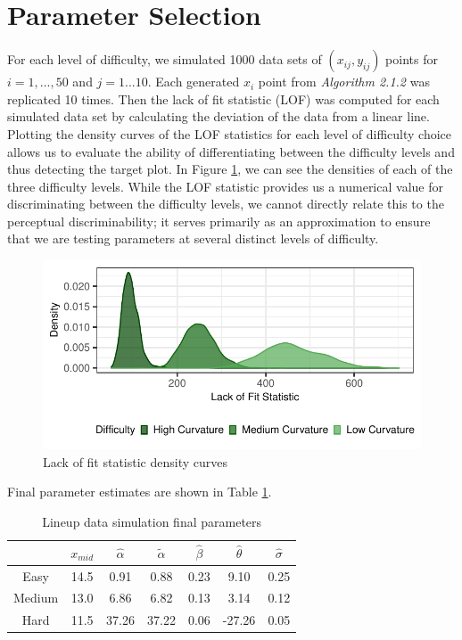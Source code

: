 \documentclass[print]{nuthesis}
\begin{document}
\hypertarget{parameter-selection}{%
\section{Parameter Selection}\label{parameter-selection}}

For each level of difficulty, we simulated 1000 data sets of \((x_{ij}, y_{ij})\) points for \(i = 1,...,50\) and \(j = 1...10\).
Each generated \(x_i\) point from \textit{Algorithm 2.1.2} was replicated 10 times. Then the lack of fit statistic (LOF) was computed for each simulated data set by calculating the deviation of the data from a linear line.
Plotting the density curves of the LOF statistics for each level of difficulty choice allows us to evaluate the ability of differentiating between the difficulty levels and thus detecting the target plot.
In Figure \ref{fig:lof-density-curves}, we can see the densities of each of the three difficulty levels.
While the LOF statistic provides us a numerical value for discriminating between the difficulty levels, we cannot directly relate this to the perceptual discriminability; it serves primarily as an approximation to ensure that we are testing parameters at several distinct levels of difficulty.

\begin{figure}

{\centering \includegraphics[width=\linewidth]{thesis_files/figure-latex/lof-density-curves-1} 

}

\caption{Lack of fit statistic density curves}\label{fig:lof-density-curves}
\end{figure}

Final parameter estimates are shown in Table \ref{tab:parameter-data}.

\begin{table}

\caption{\label{tab:parameter-data}Lineup data simulation final parameters}
\centering
\begin{tabular}[t]{ccccccc}
\toprule
 & $x_{mid}$ & $\hat\alpha$ & $\tilde\alpha$ & $\hat\beta$ & $\hat\theta$ & $\hat\sigma$\\
\midrule
Easy & 14.5 & 0.91 & 0.88 & 0.23 & 9.10 & 0.25\\
Medium & 13.0 & 6.86 & 6.82 & 0.13 & 3.14 & 0.12\\
Hard & 11.5 & 37.26 & 37.22 & 0.06 & -27.26 & 0.05\\
\bottomrule
\end{tabular}
\end{table}
\end{document}
